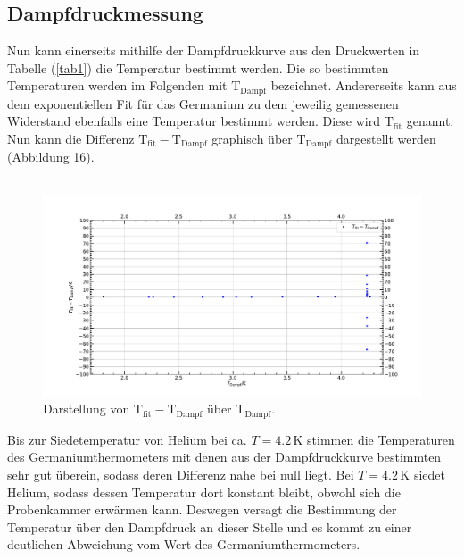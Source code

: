 \documentclass[german,  %
parskip=full,  %
]{scrartcl}
\begin{document}
\subsection{Dampfdruckmessung}
Nun kann einerseits mithilfe der Dampfdruckkurve aus den Druckwerten in Tabelle (\ref{tab1}) die Temperatur bestimmt werden. Die so bestimmten Temperaturen werden im Folgenden mit $\text{T}_{\text{Dampf}}$ bezeichnet. Andererseits kann aus dem exponentiellen Fit für das Germanium zu dem jeweilig gemessenen Widerstand ebenfalls eine Temperatur bestimmt werden. Diese wird $\text{T}_{\mathrm{fit}}$ genannt. Nun kann die Differenz $\text{T}_{\mathrm{fit}} - \text{T}_{\text{Dampf}}$ graphisch über $\text{T}_{\text{Dampf}}$ dargestellt werden (Abbildung 16). \\\\
\begin{figure}[h!]\centering
\includegraphics[width=\textwidth]{Germanium_vs_Dampf.pdf}
\caption{Darstellung von $\text{T}_{\mathrm{fit}} - \text{T}_{\text{Dampf}}$ über $\text{T}_{\text{Dampf}}$.}
\end{figure}


Bis zur Siedetemperatur von Helium bei ca. \(T= 4.2 \,\mathrm{K}\) stimmen die Temperaturen des Germaniumthermometers mit denen aus der Dampfdruckkurve bestimmten sehr gut überein, sodass deren Differenz nahe bei null liegt. Bei \(T= 4.2 \,\mathrm{K}\) siedet Helium, sodass dessen Temperatur dort konstant bleibt, obwohl sich die Probenkammer erwärmen kann. Deswegen versagt die Bestimmung der Temperatur über den Dampfdruck an dieser Stelle und es kommt zu einer deutlichen Abweichung vom Wert des Germaniumthermometers.
\end{document}
